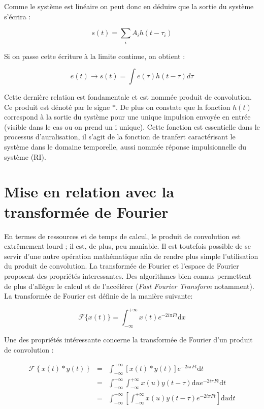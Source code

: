 Comme le système est linéaire on peut donc en déduire que la sortie du système s'écrira :

\begin{equation}        
    s(t) = \sum_{i} A_i h(t - \tau_i)
\end{equation}

Si on passe cette écriture à la limite continue, on obtient :

\begin{equation}        
    e(t) \to s(t) = \int e(\tau)h(t -\tau)d\tau
\end{equation}

Cette dernière relation est fondamentale et est nommée produit de convolution. Ce produit est dénoté par le signe $\ast$.
De plus on constate que la fonction $h(t)$ correspond à la sortie du système pour une unique impulsion envoyée en entrée (visible dans le cas ou on prend un i unique).
Cette fonction est essentielle dans le processus d'auralisation, il s'agit de la fonction de tranfert caractérisant le système dans le domaine temporelle, aussi nommée réponse impulsionnelle du système (RI).


\section{Mise en relation avec la transformée de Fourier} %


En termes de ressources et de temps de calcul, le produit de convolution est extrêmement lourd ; il est, de plus, peu maniable.
Il est toutefois possible de se servir d'une autre opération mathématique afin de rendre plus simple l'utilisation du produit de convolution.
La transformée de Fourier et l'espace de Fourier proposent des propriétés interessantes. Des algorithmes bien connus permettent de plus d'alléger le calcul et de l'accélérer (\textit{Fast Fourier Transform} notamment).
La transformée de Fourier est définie de la manière suivante:

\begin{equation}
    \mathcal{F}\{x(t)\} = \int_{-\infty}^{+\infty} x(t) e^{-2i\pi Ft} \mathrm dx
\end{equation}

Une des propriétés intéressante concerne la transformée de Fourier d'un produit de convolution :

\begin{eqnarray*}
    \mathcal{F}\left\{x(t) \ast y(t)\right\} & = & \int_{-\infty}^{+\infty} \left[x(t) \ast y(t)\right] e^{-2i\pi Ft} \mathrm dt \\
    & = & \int_{-\infty}^{+\infty} \int_{-\infty}^{+\infty} x(u)y(t - \tau ) \mathrm du e^{-2i\pi Ft} \mathrm dt \\
    & = & \int_{-\infty}^{+\infty}  \left[ \int_{-\infty}^{+\infty} x(u)y(t - \tau )  e^{-2i\pi Ft} \right] \mathrm du \mathrm dt \\
\end{eqnarray*}

